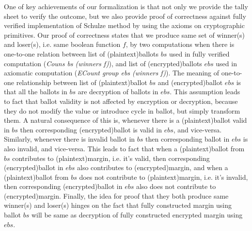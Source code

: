 \documentclass{llncs}
\begin{document}
One of key achievements of our formalization is that
not only we provide the tally sheet  
to verify the outcome, but we also provide 
proof of correctness against fully verified implementation of 
Schulze method\cite{Pattinson:2017:SVE} by using the 
axioms on cryptographic primitives. Our proof of correctness
states that we produce same set of winner(s) and loser(s), i.e. same boolean 
function $f$, by two computations 
when there is one-to-one relation between list of (plaintext)ballots 
$bs$ used  in fully verified computation 
(\textit{Couns bs (winners f)})\cite{Pattinson:2017:SVE}, 
and list of (encrypted)ballots $ebs$ used in axiomatic computation 
(\textit{ECount group ebs (winners f)}). 
The meaning of 
one-to-one relationship between list of (plaintext)ballot $bs$ and
(encrypted)ballot $ebs$ is that all the ballots in $bs$ are decryption
of ballots in $ebs$. This assumption leads to fact that
ballot validity is not affected by encryption or decryption, because 
they do not modify the value or introduce 
cycle in ballot, but simply transform them. 
A natural consequence of this is, whenever there is a 
(plaintext)ballot valid in 
$bs$ then corresponding (encrypted)ballot is valid in $ebs$, and vice-versa.
Similarly, whenever there is invalid ballot in $bs$ then 
corresponding ballot in $ebs$ is also invalid, and vice-versa. This 
leads to fact that when a (plaintext)ballot from $bs$ contributes to
(plaintext)margin, i.e. it's valid, then corresponding 
(encrypted)ballot in $ebs$ also contributes to (encrypted)margin, and 
when a (plaintext)ballot from $bs$ does not contribute to
(plaintext)margin, i.e. it's invalid, then corresponding 
(encrypted)ballot in $ebs$ also does not contribute to (encrypted)margin.
Finally, the idea for proof that they both produce same winner(s) and 
loser(s) hinges on the 
fact that fully constructed margin using ballot $bs$ will be same as 
decryption of fully constructed encrypted margin using $ebs$. 
%
%
\end{document}
